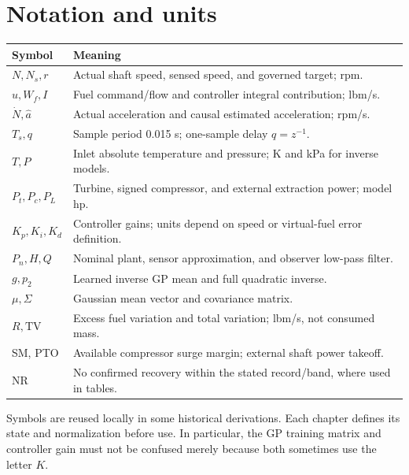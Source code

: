 \documentclass[11pt,a4paper,oneside]{report}
\begin{document}
\chapter*{Notation and units}
\begin{longtable}{p{28mm}p{126mm}}\toprule Symbol & Meaning\\\midrule
$N,N_s,r$ & Actual shaft speed, sensed speed, and governed target; rpm.\\
$u,W_f,I$ & Fuel command/flow and controller integral contribution; lbm/s.\\
$\dot N,\hat a$ & Actual acceleration and causal estimated acceleration; rpm/s.\\
$T_s,q$ & Sample period 0.015 s; one-sample delay $q=z^{-1}$.\\
$T,P$ & Inlet absolute temperature and pressure; K and kPa for inverse models.\\
$P_t,P_c,P_L$ & Turbine, signed compressor, and external extraction power; model hp.\\
$K_p,K_i,K_d$ & Controller gains; units depend on speed or virtual-fuel error definition.\\
$P_n,H,Q$ & Nominal plant, sensor approximation, and observer low-pass filter.\\
$g,p_2$ & Learned inverse GP mean and full quadratic inverse.\\
$\mu,\Sigma$ & Gaussian mean vector and covariance matrix.\\
$R,\mathrm{TV}$ & Excess fuel variation and total variation; lbm/s, not consumed mass.\\
SM, PTO & Available compressor surge margin; external shaft power takeoff.\\
NR & No confirmed recovery within the stated record/band, where used in tables.\\\bottomrule
\end{longtable}
Symbols are reused locally in some historical derivations. Each chapter defines its state and normalization before use. In particular, the GP training matrix and controller gain must not be confused merely because both sometimes use the letter $K$.
\tableofcontents\clearpage\listoffigures\clearpage\listoftables
\clearpage{}























\appendix
\end{document}
